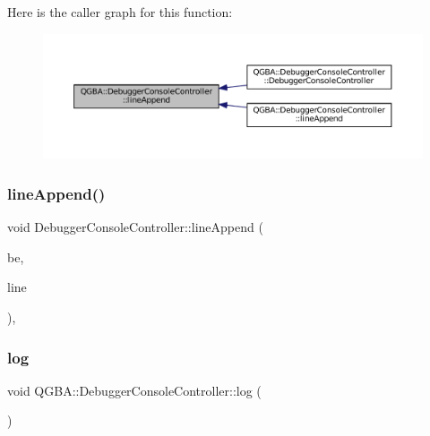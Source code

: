 Here is the caller graph for this function\+:
\nopagebreak
\begin{figure}[H]
\begin{center}
\leavevmode
\includegraphics[width=350pt]{class_q_g_b_a_1_1_debugger_console_controller_a6ca6e4b087937efb5d25e5f4703e4a7f_icgraph}
\end{center}
\end{figure}
\mbox{\label{class_q_g_b_a_1_1_debugger_console_controller_af4cf6360667c1b7ada06c8a59a1bfa60}} 
\subsubsection{\texorpdfstring{line\+Append()}{lineAppend()}\hspace{0.1cm}{\footnotesize\ttfamily [2/2]}}
{\footnotesize\ttfamily void Debugger\+Console\+Controller\+::line\+Append (\begin{DoxyParamCaption}\item[{struct C\+L\+I\+Debugger\+Backend $\ast$}]{be,  }\item[{const char $\ast$}]{line }\end{DoxyParamCaption})\hspace{0.3cm}{\ttfamily [static]}, {\ttfamily [private]}}

\mbox{\label{class_q_g_b_a_1_1_debugger_console_controller_aa05a49c51ae87e6a2c6be925b6b9d85e}} 
\subsubsection{\texorpdfstring{log}{log}}
{\footnotesize\ttfamily void Q\+G\+B\+A\+::\+Debugger\+Console\+Controller\+::log (\begin{DoxyParamCaption}\item[{const Q\+String \&}]{ }\end{DoxyParamCaption})\hspace{0.3cm}{\ttfamily [signal]}}

